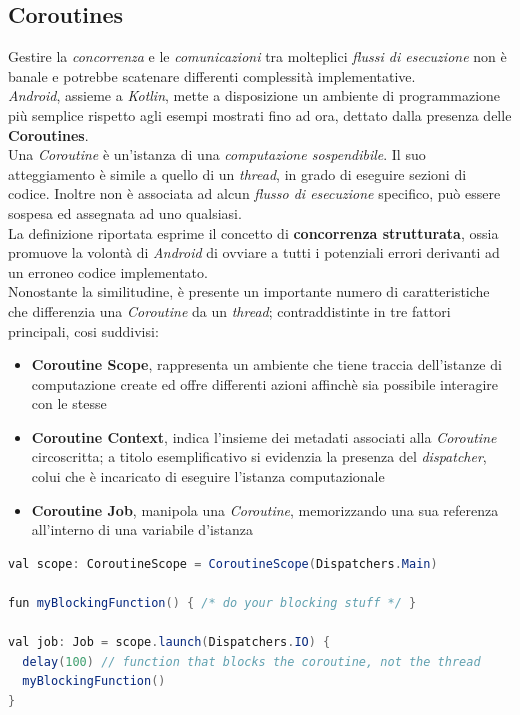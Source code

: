\documentclass{article}
\begin{document}
\subsection*{Coroutines}
Gestire la \textit{concorrenza} e le \textit{comunicazioni} tra molteplici \textit{flussi di esecuzione} non è banale e potrebbe scatenare differenti complessità implementative.\vspace*{7pt}\\
\textit{Android}, assieme a \textit{Kotlin}, mette a disposizione un ambiente di programmazione più semplice rispetto agli esempi mostrati fino ad ora, dettato dalla presenza delle \textbf{Coroutines}.\vspace*{7pt}\\
Una \textit{Coroutine} è un'istanza di una \textit{computazione sospendibile}. Il suo atteggiamento è simile a quello di un \textit{thread}, in grado di eseguire sezioni di codice. Inoltre non è associata ad alcun \textit{flusso di esecuzione} specifico, può essere sospesa ed assegnata ad uno qualsiasi.\vspace*{7pt}\\
La definizione riportata esprime il concetto di \textbf{concorrenza strutturata}, ossia promuove la volontà di \textit{Android} di ovviare a tutti i potenziali errori derivanti ad un erroneo codice implementato.\vspace*{7pt}\\
Nonostante la similitudine, è presente un importante numero di caratteristiche che differenzia una \textit{Coroutine} da un \textit{thread}; contraddistinte in tre fattori principali, cosi suddivisi:
\begin{itemize}[label={-}]
  \itemsep0em
  \item \textbf{Coroutine Scope}, rappresenta un ambiente che tiene traccia dell'istanze di computazione create ed offre differenti azioni affinchè sia possibile interagire con le stesse
  \item \textbf{Coroutine Context}, indica l'insieme dei metadati associati alla \textit{Coroutine} circoscritta; a titolo esemplificativo si evidenzia la presenza del \textit{dispatcher}, colui che è incaricato di eseguire l'istanza computazionale
  \item \textbf{Coroutine Job}, manipola una \textit{Coroutine}, memorizzando una sua referenza all'interno di una variabile d'istanza
\end{itemize}
\begin{lstlisting}[language=JAVA]
val scope: CoroutineScope = CoroutineScope(Dispatchers.Main)

fun myBlockingFunction() { /* do your blocking stuff */ }

val job: Job = scope.launch(Dispatchers.IO) {
  delay(100) // function that blocks the coroutine, not the thread
  myBlockingFunction()
}
\end{lstlisting}
\end{document}
